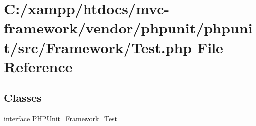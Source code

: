 \hypertarget{vendor_2phpunit_2phpunit_2src_2_framework_2test_8php}{}\section{C\+:/xampp/htdocs/mvc-\/framework/vendor/phpunit/phpunit/src/\+Framework/\+Test.php File Reference}
\label{vendor_2phpunit_2phpunit_2src_2_framework_2test_8php}
\subsection*{Classes}
\begin{DoxyCompactItemize}
\item 
interface \hyperlink{interface_p_h_p_unit___framework___test}{P\+H\+P\+Unit\+\_\+\+Framework\+\_\+\+Test}
\end{DoxyCompactItemize}
